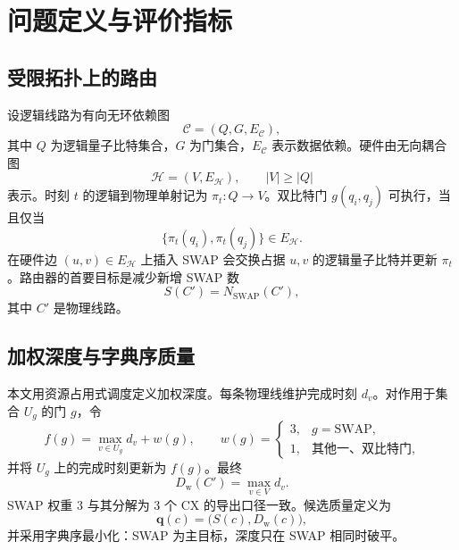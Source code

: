 \documentclass[11pt,a4paper]{article}
\newcommand{\Hardware}{\mathcal H}
\newcommand{\Circuit}{\mathcal C}
\newcommand{\DepthW}{D_{\mathrm w}}
\begin{document}
\section{问题定义与评价指标}

\subsection{受限拓扑上的路由}

设逻辑线路为有向无环依赖图
\begin{equation}
  \Circuit=(Q,G,E_{\Circuit}),
\end{equation}
其中 $Q$ 为逻辑量子比特集合，$G$ 为门集合，$E_{\Circuit}$ 表示数据依赖。硬件由无向耦合图
\begin{equation}
  \Hardware=(V,E_{\Hardware}),\qquad |V|\ge |Q|
\end{equation}
表示。时刻 $t$ 的逻辑到物理单射记为 $\pi_t:Q\rightarrow V$。双比特门 $g(q_i,q_j)$ 可执行，当且仅当
\begin{equation}
  \{\pi_t(q_i),\pi_t(q_j)\}\in E_{\Hardware}.
  \label{eq:executable}
\end{equation}
在硬件边 $(u,v)\in E_{\Hardware}$ 上插入 SWAP 会交换占据 $u,v$ 的逻辑量子比特并更新 $\pi_t$。路由器的首要目标是减少新增 SWAP 数
\begin{equation}
  S(C')=N_{\mathrm{SWAP}}(C'),
\end{equation}
其中 $C'$ 是物理线路。

\subsection{加权深度与字典序质量}

本文用资源占用式调度定义加权深度。每条物理线维护完成时刻 $d_v$。对作用于集合 $U_g$ 的门 $g$，令
\begin{equation}
  f(g)=\max_{v\in U_g}d_v+w(g),\qquad
  w(g)=
  \begin{cases}
    3,&g=\mathrm{SWAP},\\
    1,&\text{其他一、双比特门},
  \end{cases}
  \label{eq:weighted-depth}
\end{equation}
并将 $U_g$ 上的完成时刻更新为 $f(g)$。最终
\begin{equation}
  \DepthW(C')=\max_{v\in V}d_v.
\end{equation}
SWAP 权重 3 与其分解为 3 个 CX 的导出口径一致。候选质量定义为
\begin{equation}
  \mathbf q(c)=\bigl(S(c),\DepthW(c)\bigr),
  \label{eq:quality}
\end{equation}
并采用字典序最小化：SWAP 为主目标，深度只在 SWAP 相同时破平。
\end{document}
